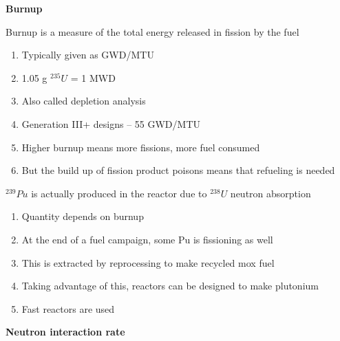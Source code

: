\documentclass[aspectratio=1610,pdftex,dvipsnames,compress,xcolor={dvipsnames}]{beamer}
\newcommand{\acf}{\acrfull} %
\begin{document}
\begin{frame}[plain]{}
    \centering\LARGE\textbf{Burnup}
\end{frame}


\addtocounter{framenumber}{-1} 
\begin{frame}{Burnup is a measure of the total energy released in fission by the fuel}
    \begin{enumerate}[series=outerlist,topsep=0pt,itemsep=21pt,leftmargin=*,label=(\arabic*)]
        \item[]Typically given as GWD/MTU
        \item[]1.05 g $^{235}U$ = 1 MWD
        \item[]Also called depletion analysis
        \item[]Generation III+ designs -- 55 GWD/MTU
        \item[]Higher burnup means more fissions, more fuel consumed
        \item[]But the build up of fission product poisons means that refueling is needed
    \end{enumerate}
\end{frame}


\begin{frame}{$^{239}Pu$ is actually produced in the reactor due to $^{238}U$ neutron absorption}
    \begin{enumerate}[series=outerlist,topsep=0pt,itemsep=21pt,leftmargin=*,label=(\arabic*)]
        \item[]Quantity depends on burnup
        \item[]At the end of a fuel campaign, some Pu is fissioning as well
        \item[]This is extracted by reprocessing to make recycled \acf{mox} fuel
        \item[]Taking advantage of this, reactors can be designed to make plutonium
        \item[]Fast reactors are used
    \end{enumerate}
\end{frame}


\begin{frame}[plain]{}
    \centering\LARGE\textbf{Neutron interaction rate}
\end{frame}
\end{document}

